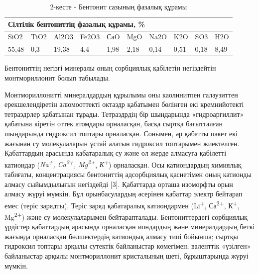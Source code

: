 \begin{table}[H]
\caption*{2-кесте - Бентонит сазының фазалық құрамы}
\centering
\begin{tabular}{|llllllllll|}
\hline
\multicolumn{10}{|l|}{Сілтілік бентониттің фазалық құрамы, \%} \\ \hline
\multicolumn{1}{|l|}{SiO2} & \multicolumn{1}{l|}{TiO2} & \multicolumn{1}{l|}{Al2O3} & \multicolumn{1}{l|}{Fe2O3} & \multicolumn{1}{l|}{СаO} & \multicolumn{1}{l|}{MgO} & \multicolumn{1}{l|}{Na2O} & \multicolumn{1}{l|}{K2O} & \multicolumn{1}{l|}{SO3} & H2O \\ \hline
\multicolumn{1}{|l|}{55,48} & \multicolumn{1}{l|}{0,3} & \multicolumn{1}{l|}{19,38} & \multicolumn{1}{l|}{4,4} & \multicolumn{1}{l|}{1,98} & \multicolumn{1}{l|}{2,18} & \multicolumn{1}{l|}{0,14} & \multicolumn{1}{l|}{0,51} & \multicolumn{1}{l|}{0,18} & 8,49 \\ \hline
\end{tabular}
\end{table}

\begin{multicols}{2}
Бентониттің негізгі минералы оның сорбциялық қабілетін негіздейтін
монтмориллонит болып табылады.

Монтмориллонитті минералдардың құрылымы оны каолинитпен галаузиттен
ерекшелендіретін алюмооттекті октаэдр қабатымен бөлінген екі
кремнийотекті тетраэдрлер қабатынан тұрады. Тетраэдрдің бір шыңдарында
«гидроаргиллит» қабатына кіретін оттек атомдары орналасқан, басқа сыртқа
бағытталған шыңдарында гидроксил топтары орналасқан. Сонымен, әр қабатты
пакет екі жағынан су молекулаларын ұстай алатын гидроксил топтарымен
жиектелген. Қабаттардың арасында қабатаралық су және ол жерде алмасуға
қабілетті катиондар (\emph{Na\textsuperscript{+},
Ca\textsuperscript{2+}, Mg\textsuperscript{2+}},
\emph{К\textsuperscript{+}}) орналасқан. Осы катиондардың химиялық
табиғаты, концентрациясы бентониттің адсорбциялық қасиетімен оның
катионды алмасу сыйымдылығын негіздейді {[}3{]}.
Қабаттарда орташа изоморфты орын алмасу жүруі мүмкін. Бұл орынбасулардың
әсерінен қабаттар электр бейтарап емес (теріс зарядты). Теріс заряд
қабатаралық катиондармен (Li\textsuperscript{+}, Са\textsuperscript{2+},
К\textsuperscript{+}, Mg\textsuperscript{2+}) және су молекулаларымен
бейтарапталады. Бентониттердегі сорбциялық үрдістер қабаттардың арасында
орналасқан иондардың және минералдардың беткі жағында орналасқан
бөлшектердің катиондық алмасу типі бойынша; сыртқы гидроксил топтары
арқылы сутектік байланыстар көмегімен; валенттік «үзілген» байланыстар
арқылы монтмориллонит кристалының шеті, бұрыштарында жүруі мүмкін.
\end{multicols}

